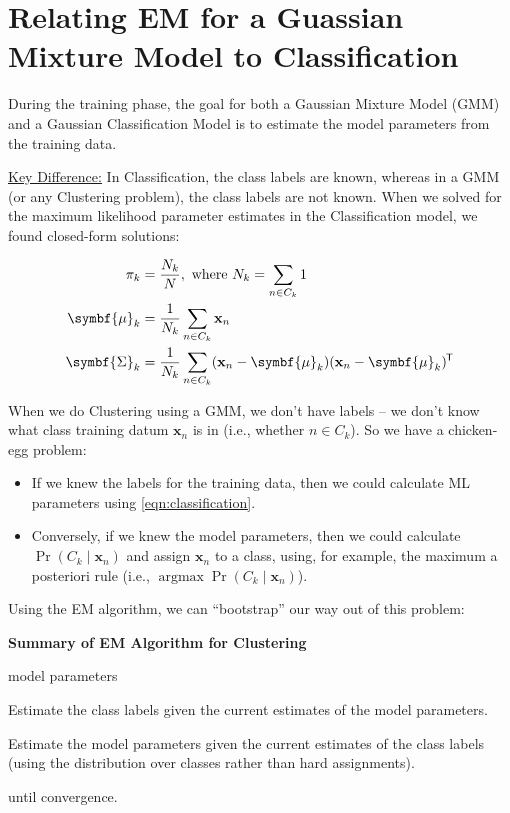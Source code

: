 \documentclass[11pt]{article}
\newcounter{descriptcount}
\DeclareMathOperator*{\argmax}{argmax}
\newcommand{\xb}{\mathbf{x}}
\newcommand{\ub}{\symbf{\mu}}
\newcommand{\Sb}{\symbf{\Sigma}}
\newcommand*{\tran}{^{\mkern-1.5mu\mathsf{T}}}
\begin{document}
\section{Relating EM for a Guassian Mixture Model to Classification}

During the training phase, the goal for both a Gaussian Mixture Model (GMM) and
a Gaussian Classification Model is to estimate the model parameters from the
training data.

\underline{Key Difference:} In Classification, the class labels are known,
whereas in a GMM (or any Clustering problem), the class labels are not known.
When we solved for the maximum likelihood parameter estimates in the
Classification model, we found closed-form solutions:

\begin{align}
  \pi_k &= \frac{N_k}{N}, \text{ where } N_k = \sum_{n \in C_k} 1 \\
  \ub_k &= \frac{1}{N_k} \sum_{n \in C_k} \xb_n \\
  \Sb_k &= \frac{1}{N_k} \sum_{n \in C_k} (\xb_n - \ub_k) (\xb_n - \ub_k)\tran
  \label{eqn:classification}
\end{align}

When we do Clustering using a GMM, we don't have labels -- we don't know what
class training datum $\xb_n$ is in (i.e., whether $n \in C_k$). So we have a
chicken-egg problem:

\begin{itemize}
  \item If we knew the labels for the training data, then we could calculate ML
  parameters using \eqref{eqn:classification}.
  \item Conversely, if we knew the model parameters, then we could calculate
  $\Pr(C_k \mid \xb_n)$ and assign $\xb_n$ to a class, using, for example,
  the maximum a posteriori rule (i.e., $\argmax \Pr(C_k\mid\xb_n)$).
\end{itemize}

Using the EM algorithm, we can ``bootstrap'' our way out of this problem:

\begin{framed}
\textbf{Summary of EM Algorithm for Clustering}
\begin{description}[%
  before={\setcounter{descriptcount}{0}},%
  ,leftmargin=1cm,labelindent=1cm%
  ,font=\bfseries\stepcounter{descriptcount}\thedescriptcount.~]
  \item[Initialize] model parameters
  \item[E-step:] Estimate the class labels given the current estimates of the
  model parameters.
  \item[M-step:] Estimate the model parameters given the current estimates of
  the class labels (using the distribution over classes rather than hard
  assignments).
  \item[Go to step 2:] until convergence.
\end{description}
\end{framed}
\end{document}
